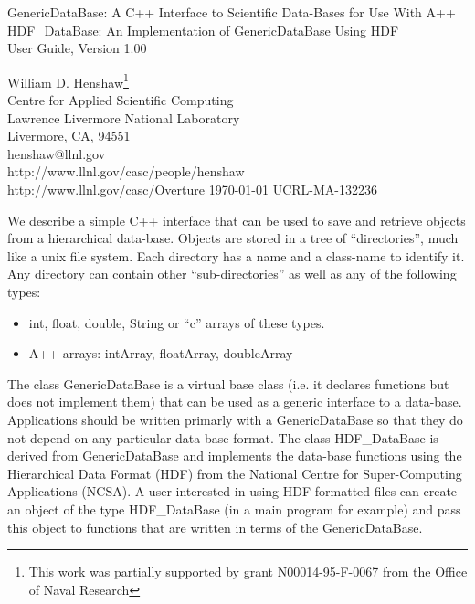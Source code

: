 \documentclass{article}
\begin{document}
\vspace{5\baselineskip}
\begin{flushleft}
{\Large
GenericDataBase: A C++ Interface to Scientific Data-Bases for Use With A++\\
\vspace{ .25\baselineskip}
HDF\_DataBase: An Implementation of GenericDataBase Using HDF \\
\vspace{ .5\baselineskip}
User Guide, Version 1.00 \\
}

\vspace{2\baselineskip}
William D. Henshaw\footnote{
        This work was partially
        supported by grant N00014-95-F-0067 from the Office of Naval
        Research
        }                               \\
Centre for Applied Scientific Computing \\
Lawrence Livermore National Laboratory    \\
Livermore, CA, 94551   \\
henshaw@llnl.gov \\
http://www.llnl.gov/casc/people/henshaw \\
http://www.llnl.gov/casc/Overture
\vspace{2\baselineskip}
\today
\vspace{\baselineskip}
UCRL-MA-132236

\vspace{4\baselineskip}

We describe a simple C++ interface that can be used to save and retrieve objects
from a hierarchical data-base. Objects are stored in a tree of ``directories'',
much like a unix file system.
Each directory has a name and a class-name to identify it. Any directory can
contain other ``sub-directories'' as well as any of the following types:
\begin{itemize}
  \item int, float, double, String or ``c'' arrays of these types.
  \item A++ arrays: intArray, floatArray, doubleArray
\end{itemize}
The class {\ff GenericDataBase} is a virtual base class (i.e. it declares functions
but does not implement them) that can be used as a generic interface to a data-base.
Applications should be written primarly with a {\ff GenericDataBase} so that they
do not depend on any particular data-base format.
The class {\ff HDF\_DataBase} is derived from {\ff GenericDataBase} and implements
the data-base functions using the Hierarchical Data Format (HDF) from the National Centre
for Super-Computing Applications (NCSA). A user interested in using HDF formatted files
can create an object of the type {\ff HDF\_DataBase} (in a main program for example) and pass
this object to functions that are written in terms of the {\ff GenericDataBase}.

\end{flushleft}
\end{document}
